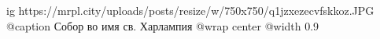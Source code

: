  
 
 
 
 

\ifcmt
	ig https://mrpl.city/uploads/posts/resize/w/750x750/q1jzxezecvfskkoz.JPG
	@caption Собор во имя св. Харлампия
  @wrap center
  @width 0.9
\fi
